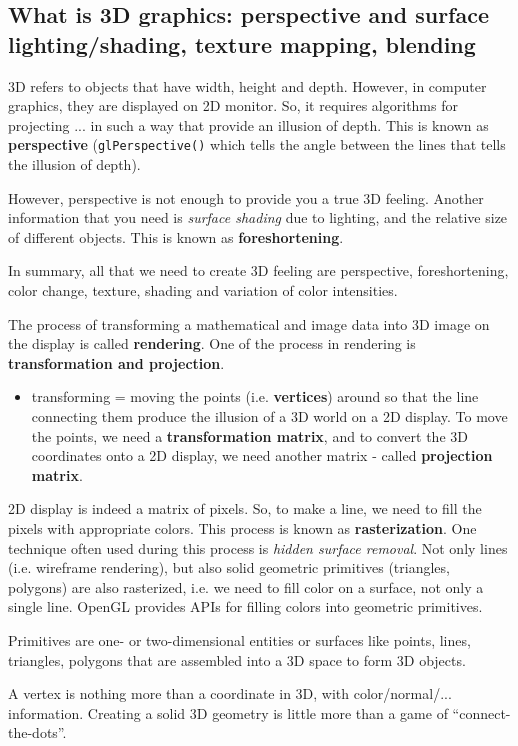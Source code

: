 \subsection{What is 3D graphics: perspective and surface
lighting/shading, texture mapping, blending}

3D refers to objects that have width, height and depth. However, in
computer graphics, they are displayed on 2D monitor. So, it requires
algorithms for projecting ... in such a way that provide an illusion of
depth. This is known as {\bf perspective} (\verb!glPerspective()!
which tells the angle between the lines that tells the illusion of
depth).

However, perspective is not enough to provide you a true 3D
feeling. Another information that you need is {\it surface shading}
due to lighting, and the relative size of different objects.
This is known as {\bf foreshortening}. 

\begin{framed}
  In summary, all that we need to create 3D feeling are perspective,
  foreshortening, color change, texture, shading and variation of
  color intensities. 
\end{framed}

The process of transforming a mathematical and image data into 3D
image on the display is called {\bf rendering}. One of the process in
rendering is {\bf transformation and projection}. 
\begin{itemize}
\item transforming = moving the points (i.e. {\bf vertices}) around so
  that the line connecting them produce the illusion of a 3D world on
  a 2D display. To move the points, we need a {\bf transformation
    matrix}, and to convert the 3D coordinates onto a 2D display, we
  need another matrix - called {\bf projection matrix}. 
\end{itemize}

2D display is indeed a matrix of pixels. So, to make a line, we need
to fill the pixels with appropriate colors. This process is known as
{\bf rasterization}. One technique often used during this process is
{\it hidden surface removal}. Not only lines (i.e. wireframe
rendering), but also solid geometric primitives (triangles, polygons)
are also rasterized, i.e. we need to fill color on a surface, not only
a single line. OpenGL provides APIs for filling colors into geometric
primitives.

\begin{framed}
  Primitives are one- or two-dimensional entities or surfaces like
  points, lines, triangles, polygons that are assembled into a 3D
  space to form 3D objects.

  A vertex is nothing more than a coordinate in 3D, with
  color/normal/... information. Creating a solid 3D geometry is little
  more than a game of ``connect-the-dots''. 
\end{framed}


